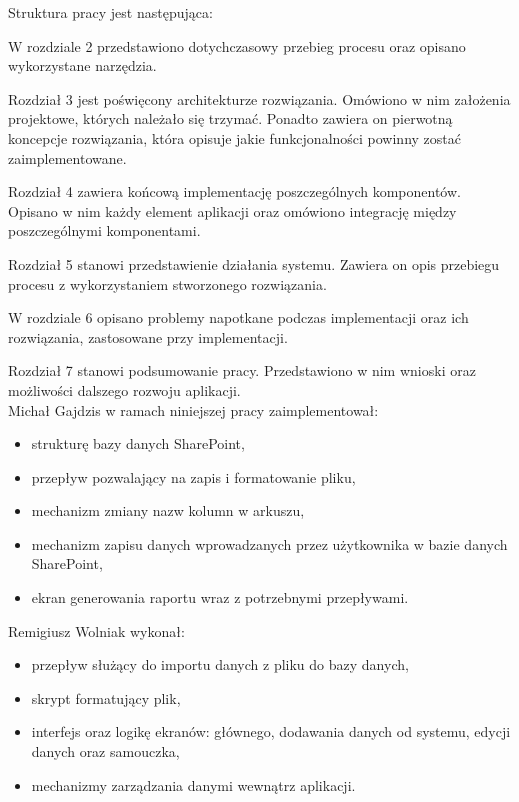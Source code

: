 \vspace{0.5cm}
Struktura pracy jest następująca:

\noindent W rozdziale 2  przedstawiono dotychczasowy przebieg procesu oraz opisano wykorzystane narzędzia.

\noindent Rozdział 3 jest poświęcony architekturze rozwiązania. Omówiono w nim założenia projektowe, których należało się trzymać. Ponadto zawiera on pierwotną koncepcje rozwiązania, która opisuje jakie funkcjonalności powinny zostać zaimplementowane.

\noindent Rozdział 4 zawiera końcową implementację poszczególnych komponentów. Opisano w nim każdy element aplikacji oraz omówiono integrację między poszczególnymi komponentami.

\noindent Rozdział 5 stanowi przedstawienie działania systemu. Zawiera on opis przebiegu procesu z wykorzystaniem stworzonego rozwiązania.

\noindent W rozdziale 6 opisano problemy napotkane podczas implementacji oraz ich rozwiązania, zastosowane przy implementacji.

\noindent Rozdział 7 stanowi podsumowanie pracy. Przedstawiono w nim wnioski oraz możliwości dalszego rozwoju aplikacji.\\

\vspace{0.5cm}
\noindent Michał Gajdzis w ramach niniejszej pracy zaimplementował:
\begin{itemize}
    \item strukturę bazy danych SharePoint,
    \item przepływ pozwalający na zapis i formatowanie pliku,
    \item mechanizm zmiany nazw kolumn w arkuszu,
    \item mechanizm zapisu danych wprowadzanych przez użytkownika w bazie danych SharePoint,
    \item ekran generowania raportu wraz z potrzebnymi przepływami.
\end{itemize}

\vspace{0.5cm}
\noindent Remigiusz Wolniak wykonał:
\begin{itemize}
    \item przepływ służący do importu danych z pliku do bazy danych,
    \item skrypt formatujący plik,
    \item interfejs oraz logikę ekranów: głównego, dodawania danych od systemu, edycji danych oraz samouczka,
    \item mechanizmy zarządzania danymi wewnątrz aplikacji.
\end{itemize}